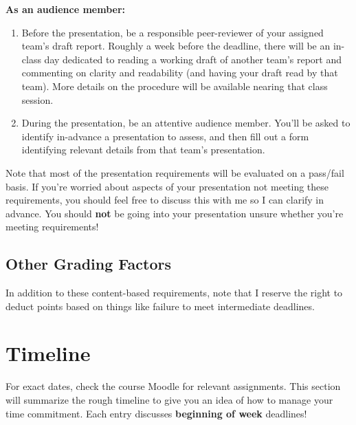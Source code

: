 \documentclass{article}
\begin{document}
\textbf{As an audience member:}
\begin{enumerate}
    \item Before the presentation, be a responsible peer-reviewer of your assigned team's draft report. Roughly a week before the deadline, there will be an in-class day dedicated to reading a working draft of another team's report and commenting on clarity and readability (and having your draft read by that team). More details on the procedure will be available nearing that class session.

    \item During the presentation, be an attentive audience member. You'll be asked to identify in-advance a presentation to assess, and then fill out a form identifying relevant details from that team's presentation. 
\end{enumerate}

Note that most of the presentation requirements will be evaluated on a pass/fail basis. If you're worried about aspects of your presentation not meeting these requirements, you should feel free to discuss this with me so I can clarify in advance. You should \textbf{not} be going into your presentation unsure whether you're meeting requirements!

\subsection{Other Grading Factors}
In addition to these content-based requirements, note that I reserve the right to deduct points based on things like failure to meet intermediate deadlines.

\section{Timeline}
For exact dates, check the course Moodle for relevant assignments. This section will summarize the rough timeline to give you an idea of how to manage your time commitment. Each entry discusses \textbf{beginning of week} deadlines!
\end{document}
